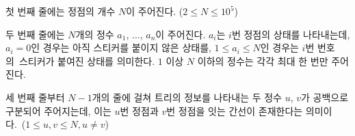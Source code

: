 첫 번째 줄에는 정점의 개수 $N$이 주어진다. ($2 \le N \le 10^5$)

두 번째 줄에는 $N$개의 정수 $a_1$, ..., $a_n$이 주어진다. $a_i$는 $i$번 정점의 상태를 나타내는데, $a_i=0$인 경우는 아직 스티커를 붙이지 않은 상태를, $1 \le a_i \le N$인 경우는 $i$번 번호의 스티커가 붙여진 상태를 의미한다. $1$ 이상 $N$ 이하의 정수는 각각 최대 한 번만 주어진다.

세 번째 줄부터 $N-1$개의 줄에 걸쳐 트리의 정보를 나타내는 두 정수 $u$, $v$가 공백으로 구분되어 주어지는데, 이는 $u$번 정점과 $v$번 정점을 잇는 간선이 존재한다는 의미이다. ($1 \le u, v \le N, u \ne v$)